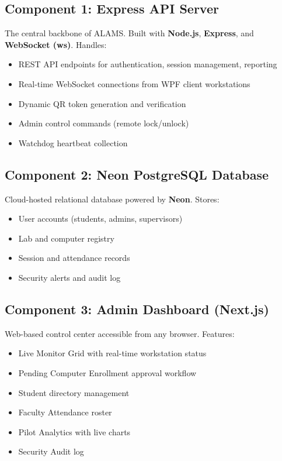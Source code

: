 \subsection{Component 1: Express API Server}

The central backbone of ALAMS. Built with \textbf{Node.js}, \textbf{Express}, and \textbf{WebSocket (ws)}. Handles:
\begin{itemize}
  \item REST API endpoints for authentication, session management, reporting
  \item Real-time WebSocket connections from WPF client workstations
  \item Dynamic QR token generation and verification
  \item Admin control commands (remote lock/unlock)
  \item Watchdog heartbeat collection
\end{itemize}

\subsection{Component 2: Neon PostgreSQL Database}

Cloud-hosted relational database powered by \textbf{Neon}. Stores:
\begin{itemize}
  \item User accounts (students, admins, supervisors)
  \item Lab and computer registry
  \item Session and attendance records
  \item Security alerts and audit log
\end{itemize}

\subsection{Component 3: Admin Dashboard (Next.js)}

Web-based control center accessible from any browser. Features:
\begin{itemize}
  \item Live Monitor Grid with real-time workstation status
  \item Pending Computer Enrollment approval workflow
  \item Student directory management
  \item Faculty Attendance roster
  \item Pilot Analytics with live charts
  \item Security Audit log
\end{itemize}

